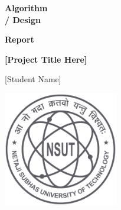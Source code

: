 


\begin{minipage}[t]{0.7\linewidth}
    \begin{singlespace}
        \fontsize{60}{65}\selectfont \textcolor{FSBlue}{\textbf{Algorithm\\ / Design}}

        \fontsize{60}{65}\selectfont \textcolor{FSBlue}{\textbf{Report}}

        \vspace{10mm}
        \LARGE\textcolor{FSBlue}{\textbf{[Project Title Here]}}

        \vspace{0.5in}

        \Large\textcolor{FSBlue}{[Student Name]}

        \vspace{2in}

    \end{singlespace}
\end{minipage}
\begin{minipage}[t]{0.35\linewidth}\raggedleft
    \vspace{1in}
    \includegraphics[width=5cm]{images/NSUT.png}
\end{minipage}

\thispagestyle{empty}
\restoregeometry
\newpage